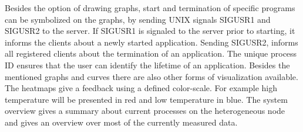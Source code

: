 Besides the option of drawing graphs, start and termination of specific programs can be symbolized on the graphs, by sending UNIX signals SIGUSR1 and SIGUSR2 to the server. If SIGUSR1 is signaled to the server prior to starting, it informs the clients about a newly started application. Sending SIGUSR2, informs all registered clients about the termination of an application. The unique process ID ensures that the user can identify the lifetime of an application.\newline
Besides the mentioned graphs and curves there are also other forms of visualization available. The heatmaps give a feedback using a defined color-scale. For example high temperature will be presented in red and low temperature in blue.\newline
The system overview gives a summary about current processes on the heterogeneous node and gives an overview over most of the currently measured data.  



